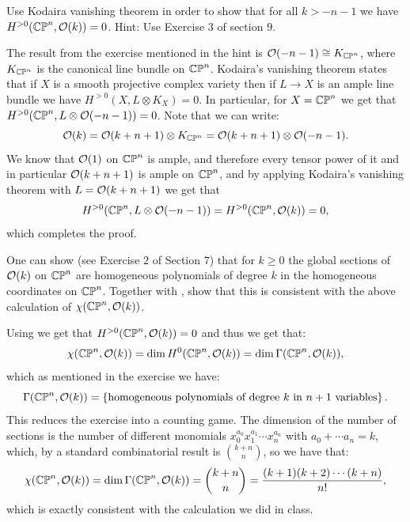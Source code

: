 \documentclass[11pt, a4paper]{article}
\begin{document}
\begin{exercise}
  \label{ex:eleven-two}
  Use Kodaira vanishing theorem in order to show that for all $k > - n - 1$
  we have $H^{> 0}(\mathbb{CP}^n,\mathcal{O}(k)) = 0$.
  Hint: Use Exercise $3$ of section $9$.
\end{exercise}
\begin{solution}
  The result from the exercise mentioned in the hint
  is $\mathcal{O}(-n-1) \cong K_{\mathbb{CP}^n}$, where $K_{\mathbb{CP}^n}$ is the canonical line
  bundle on $\mathbb{CP}^n$.
  Kodaira's vanishing theorem states that if $X$ is a smooth
  projective complex variety then if $L \to X$ is an ample line bundle
  we have $H^{> 0}(X,L \otimes K_X) = 0$.
  In particular, for $X = \mathbb{CP}^n$ we get that
  $H^{> 0}(\mathbb{CP}^n,L \otimes \mathcal{O}(-n-1)) = 0$.
  Note that we can write:
  \[
    \mathcal{O}(k) =
    \mathcal{O}(k + n + 1) \otimes K_{\mathbb{CP}^n} =
    \mathcal{O}(k + n + 1) \otimes \mathcal{O}(-n-1).
  \]
  We know that $\mathcal{O}(1)$ on $\mathbb{CP}^n$ is ample,
  and therefore every tensor power of it and in particular
  $\mathcal{O}(k + n + 1)$ is ample on $\mathbb{CP}^n$,
  and by applying Kodaira's vanishing theorem with $L = \mathcal{O}(k + n + 1)$
  we get that
  \[
    H^{> 0}(\mathbb{CP}^n,L \otimes \mathcal{O}(-n-1)) = H^{> 0}(\mathbb{CP}^n,\mathcal{O}(k)) = 0,
  \]
  which completes the proof.
\end{solution}

\begin{exercise}
  One can show (see Exercise $2$ of Section $7$) that for $k \geq 0$
  the global sections of $\mathcal{O}(k)$ on $\mathbb{CP}^n$ are homogeneous polynomials of degree
  $k$ in the homogeneous coordinates on $\mathbb{CP}^n$.
  Together with , show that this is consistent with the above
  calculation of $\chi(\mathbb{CP}^n,\mathcal{O}(k))$.
\end{exercise}
\begin{solution}
  Using  we get that $H^{> 0}(\mathbb{CP}^n,\mathcal{O}(k)) = 0$
  and thus we get that:
  \[
    \chi(\mathbb{CP}^n,\mathcal{O}(k)) =
    \dim H^0(\mathbb{CP}^n,\mathcal{O}(k)) =
    \dim \Gamma(\mathbb{CP}^n,\mathcal{O}(k)),
  \]
  which as mentioned in the exercise we have:
  \[
    \Gamma(\mathbb{CP}^n,\mathcal{O}(k)) = 
      \left\{\text{homogeneous polynomials of degree $k$ in $n + 1$ variables}\right\}.
  \]
  This reduces the exercise into a counting game.
  The dimension of the number of sections is the number
  of different monomials $x_0^{a_0} x_1^{a_1} \cdots x_n^{a_n}$
  with $a_0 + \cdots a_n = k$,
  which, by a standard combinatorial result is $\binom{k+n}{n}$,
  so we have that:
  \[
    \chi(\mathbb{CP}^n,\mathcal{O}(k)) =
    \dim \Gamma(\mathbb{CP}^n,\mathcal{O}(k)) =
    \binom{k + n}{n} =
    \frac{(k + 1)(k + 2) \cdots (k + n)}{n!},
  \]
  which is exactly consistent with the calculation we did in class.
\end{solution}
\end{document}

